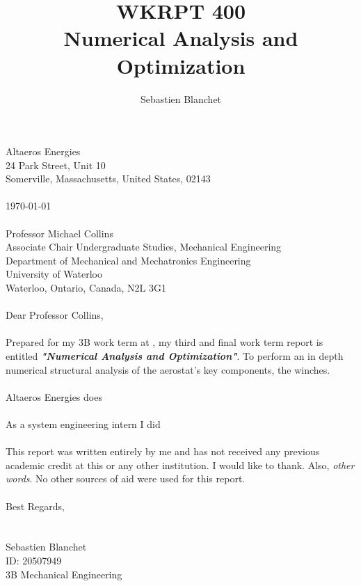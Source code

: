 \newcommand{\Company}{Altaeros Energies }
\newcommand{\Term}{3B }
\newcommand{\Seb}{Sebastien Blanchet }
\newcommand{\ReportTitle}{Numerical Analysis and Optimization}


\title[WKRPT 400]{WKRPT 400\\ \ReportTitle}%
\author{\Seb}
\preparedfor{\Company}
\maketitle
\begin{declaration}
    \noindent
	\Company\\
	24 Park Street, Unit 10\\
	Somerville, Massachusetts, United States, 02143\\
	\\  
    \noindent  	
    \today \\
  	\\  
    \noindent
    Professor Michael Collins\\
	Associate Chair Undergraduate Studies, Mechanical Engineering\\
	Department of Mechanical and Mechatronics Engineering\\
	University of Waterloo\\
	Waterloo, Ontario, Canada, N2L 3G1\\	\\
    \noindent
    Dear Professor Collins,\\ \\
	\noindent
    Prepared for my \Term work term at , my third and final work term report is
	entitled \textbf{\emph{"\ReportTitle"}}. To perform an in depth numerical structural analysis of the aerostat's key components, the winches.\\ \\
	\noindent	
	\Company  does\\\\
	\noindent
	As a system engineering intern I did\\ \\
	\noindent
	This report was written entirely by me and has not received any previous academic credit at this or
	any other institution. I would like to thank. Also, \emph{other words}. No other sources of aid were used for this report.\\ \\
	\noindent
	Best Regards,\\
	\\
	\\
	\noindent
	\Seb\\
	ID: 20507949\\
	\Term Mechanical Engineering\\
	\\
	
\end{declaration}
